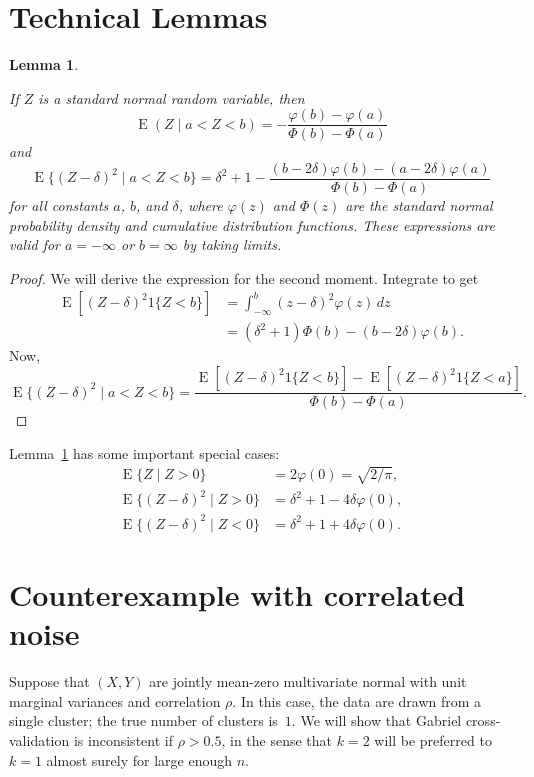 \documentclass[11pt]{article}
\newtheorem{lemma}{Lemma}
\newcommand{\E}{\operatorname{E}}
\begin{document}
\section{Technical Lemmas}

\begin{lemma}\label{lem:truncated-normal-moments}

If $Z$ is a standard normal random variable, then
\[
  \E(Z \mid a < Z < b)
    = - \frac{\varphi(b) - \varphi(a)}
             {\Phi(b) - \Phi(a)}
\]
and
\[
  \E\{(Z - \delta)^2 \mid a < Z < b\}
    = \delta^2 + 1
    - \frac{  (b - 2 \delta) \varphi(b)
            - (a - 2 \delta) \varphi(a)}
           {\Phi(b) - \Phi(a)}
\]
for all constants $a$, $b$, and $\delta$, where $\varphi(z)$ and $\Phi(z)$ are
the standard normal probability density and cumulative distribution functions.
These expressions are valid for $a = -\infty$ or $b = \infty$ by taking
limits.

\end{lemma}
\begin{proof}
We will derive the expression for the second moment.  Integrate to get
\begin{align*}
  \E[ (Z - \delta)^2 1\{Z < b\}]
    &= \int_{-\infty}^b (z - \delta)^2 \varphi(z) \, dz \\
    &= (\delta^2 + 1) \Phi(b) - (b - 2 \delta) \varphi(b).
\end{align*}
Now,
\[
  \E\{(Z - \delta)^2 \mid a < Z < b\}
    =
    \frac{  \E[ (Z - \delta)^2 1\{Z < b\}]
          - \E[ (Z - \delta)^2 1\{Z < a\}]}
         { \Phi(b) - \Phi(a) }.
\]
\end{proof}

Lemma~\ref{lem:truncated-normal-moments} has some important special cases:
\begin{align*}
  \E\{Z \mid Z > 0\} &= 2 \varphi(0) = \sqrt{2 / \pi}, \\
  \E\{(Z - \delta)^2 \mid Z > 0 \}
    &= \delta^2 + 1 - 4 \delta \varphi(0), \\
  \E\{(Z - \delta)^2 \mid Z < 0 \}
    &= \delta^2 + 1 + 4 \delta \varphi(0).
\end{align*}


\section{Counterexample with correlated noise}

Suppose that $(X, Y)$ are jointly mean-zero multivariate normal with unit
marginal variances and correlation $\rho$.  In this case, the data are drawn
from a single cluster; the true number of clusters is~$1$.  We will show that
Gabriel cross-validation is inconsistent if $\rho > 0.5$, in the sense that $k
= 2$ will be preferred to $k = 1$ almost surely for large enough $n$.
\end{document}
